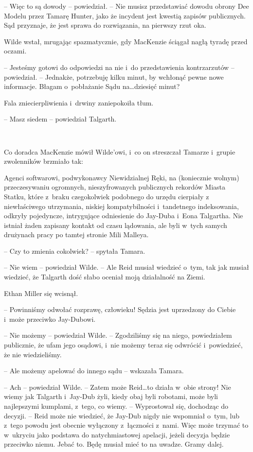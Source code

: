 \documentclass[oneside,polish,11pt,sfheadings]{mwbk}
\begin{document}
-- Więc to są dowody -- powiedział. -- Nie musisz przedstawiać dowodu
obrony Dee Modelu przez Tamarę Hunter, jako że incydent jest kwestią
zapisów publicznych. Sąd przyznaje, że jest sprawa do rozwiązania, na
pierwszy rzut oka.

Wilde wstał, mrugając spazmatycznie, gdy MacKenzie ściągał nagłą tyradę
przed oczami.

-- Jesteśmy gotowi do odpowiedzi na nie i~do przedstawienia kontrzarzutów
-- powiedział. -- Jednakże, potrzebuję kilku minut, by wchłonąć pewne nowe
informacje. Błagam o~pobłażanie Sądu na\ldots dziesięć minut?

Fala zniecierpliwienia i~drwiny zaniepokoiła tłum.

-- Masz siedem -- powiedział Talgarth.

~

Co doradca MacKenzie mówił Wilde'owi, i~co on streszczał Tamarze i~grupie zwolenników brzmiało tak:

Agenci softwarowi, podwykonawcy Niewidzialnej Ręki, na (koniecznie
wolnym) przeczesywaniu ogromnych, nieszyfrowanych publicznych rekordów
Miasta Statku, które z~braku czegokolwiek podobnego do urzędu cierpiały
z niewłaściwego utrzymania, niskiej kompatybilności i~tandetnego
indeksowania, odkryły pojedyncze, intrygujące odniesienie do Jay-Duba i~Eona Talgartha. Nie istniał żaden zapisany kontakt od czasu lądowania,
ale byli w~tych samych drużynach pracy po tamtej stronie Mili Malleya.

-- Czy to zmienia cokolwiek? -- spytała Tamara.

-- Nie wiem -- powiedział Wilde. -- Ale Reid musiał wiedzieć o~tym, tak jak
musiał wiedzieć, że Talgarth dość słabo oceniał moją działalność na
Ziemi.

Ethan Miller się wcisnął. 

-- Powinniśmy odwołać rozprawę, człowieku!
Sędzia jest uprzedzony do Ciebie i~może przeciwko Jay-Dubowi.

-- Nie możemy -- powiedział Wilde. -- Zgodziliśmy się na niego,
powiedziałem publicznie, że ufam jego osądowi, i~nie możemy teraz się
odwrócić i~powiedzieć, że nie wiedzieliśmy.

-- Ale możemy apelować do innego sądu -- wskazała Tamara.

-- Ach -- powiedział Wilde. -- Zatem może Reid\ldots to działa w~obie strony!
Nie wiemy jak Talgarth i~Jay-Dub żyli, kiedy obaj byli robotami, może
byli najlepszymi kumplami, z~tego, co wiemy. -- Wyprostował się,
dochodząc do decyzji. -- Reid może nie wiedzieć, że Jay-Dub nigdy nie
wspomniał o~tym, lub z~tego powodu jest obecnie wyłączony z~łączności z~nami. Więc może trzymać to w~ukryciu jako podstawa do natychmiastowej
apelacji, jeżeli decyzja będzie przeciwko niemu. Jebać to. Będę musiał
mieć to na uwadze. Gramy dalej.
\end{document}
